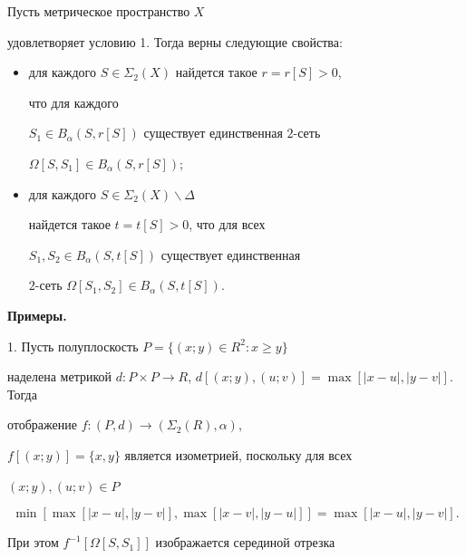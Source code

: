 \begin{cornonum}


Пусть метрическое пространство $X$


удовлетворяет условию 1. Тогда верны следующие свойства:


\begin{itemize}


\item[(i)]  для каждого  $S \in \Sigma_{2} (X)$ найдется такое $r = r[S] > 0$,


что для каждого


$S_{1} \in B_{\alpha}(S,r[S])$  существует единственная $2$-сеть


$\Omega [S,S_{1}]  \in B_{\alpha}(S,r[S])$;


\item[(ii)]  для каждого  $S \in \Sigma_{2}(X)\backslash \Delta$


найдется такое $t = t[S] > 0$, что для всех


$S_{1}, S_{2} \in B_{\alpha}(S,t[S])$  существует единственная


$2$-сеть $\Omega [S_{1},S_{2}]  \in B_{\alpha}(S,t[S]).$


\end{itemize}


\end{cornonum}





{\bf Примеры.}


\medskip





1. Пусть полуплоскость $P = \{(x;y) \in R^{2} : x \geq y \}$


наделена метрикой $d : P\times P \rightarrow R$, $d[(x; y),(u; v)]


= \max [|x - u|,|y - v|]$. Тогда


отображение $f : (P,d) \rightarrow (\Sigma_{2}(R),\alpha)$,


$f[(x;y)] = \{x, y\}$ является изометрией, поскольку для всех


$(x; y), (u; v) \in P$


$$


\min [\max [|x - u|,|y - v|],\max [|x - v|,|y - u|]] =


\max [|x - u|,|y - v|].


$$


При этом $f ^{-1}[\Omega [S,S_{1}]]$ изображается серединой отрезка



